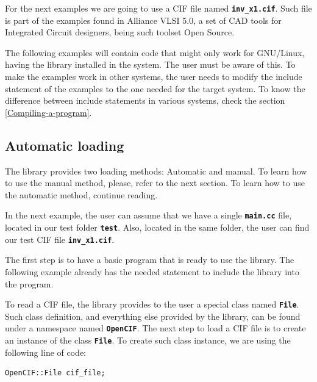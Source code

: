 \documentclass[11pt,twoside,openany,x11names,svgnames]{memoir}
\begin{document}
For the next examples we are going to use a CIF file named \textbf{\texttt{inv\_x1.cif}}. Such file is part of the examples found in Alliance VLSI 5.0, a set of CAD tools for Integrated Circuit designers, being such toolset Open Source.

The following examples will contain code that might only work for GNU/Linux, having the library installed in the system. The user must be aware of this. To make the examples work in other systems, the user needs to modify the include statement of the examples to the one needed for the target system. To know the difference between include statements in various systems, check the section \ref{Compiling-a-program}.

\subsection{Automatic loading}\label{Automatic-loading}

The library provides two loading methods: Automatic and manual. To learn how to use the manual method, please, refer to the next section. To learn how to use the automatic method, continue reading.

In the next example, the user can assume that we have a single \textbf{\texttt{main.cc}} file, located in our test folder \textbf{\texttt{test}}. Also, located in the same folder, the user can find our test CIF file \textbf{\texttt{inv\_x1.cif}}.

The first step is to have a basic program that is ready to use the library. The following example already has the needed statement to include the library into the program.



To read a CIF file, the library provides to the user a special class named \textbf{\texttt{File}}. Such class definition, and everything else provided by the library, can be found under a namespace named \textbf{\texttt{OpenCIF}}. The next step to load a CIF file is to create an instance of the class \textbf{\texttt{File}}. To create such class instance, we are using the following line of code:

\begin{lstlisting}[frame=single,style=CPPStyle]
OpenCIF::File cif_file;
\end{lstlisting}
\end{document}
